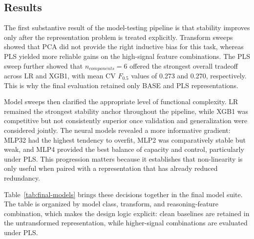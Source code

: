 \documentclass{article}
\theoremstyle{plain}
\theoremstyle{definition}
\theoremstyle{remark}
\begin{document}
\subsection{Results}
The first substantive result of the model-testing pipeline is that stability improves only after the representation problem is treated explicitly. Transform sweeps showed that PCA did not provide the right inductive bias for this task, whereas PLS yielded more reliable gains on the high-signal feature combinations. The PLS sweep further showed that $n_{components}=6$ offered the strongest overall tradeoff across LR and XGB1, with mean CV $F_{0.5}$ values of 0.273 and 0.270, respectively. This is why the final evaluation retained only BASE and PLS representations.

Model sweeps then clarified the appropriate level of functional complexity. LR remained the strongest stability anchor throughout the pipeline, while XGB1 was competitive but not consistently superior once validation and generalization were considered jointly. The neural models revealed a more informative gradient: MLP32 had the highest tendency to overfit, MLP2 was comparatively stable but weak, and MLP4 provided the best balance of capacity and control, particularly under PLS. This progression matters because it establishes that non-linearity is only useful when paired with a representation that has already reduced redundancy.

Table~\ref{tab:final-models} brings these decisions together in the final model suite. The table is organized by model class, transform, and reasoning-feature combination, which makes the design logic explicit: clean baselines are retained in the untransformed representation, while higher-signal combinations are evaluated under PLS.

\begin{table}[t]
\centering
\small
{}
\caption{Final model suite (validation and private-test).}
\label{tab:final-models}
\end{table}
\end{document}
